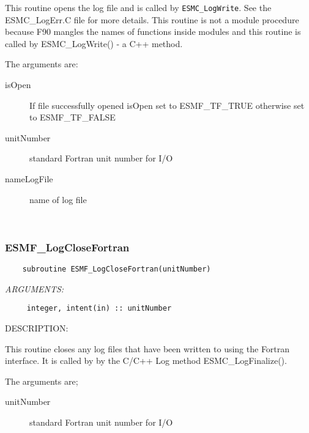    This routine opens the log file and is called by {\tt ESMC\_LogWrite}.
   See the ESMC\_LogErr.C file for more details.
   This routine is not a module procedure because F90 mangles
   the names of functions
   inside modules and this routine is called by ESMC\_LogWrite() - a C++
   method.
  
   The arguments are:
   \begin{description}
  
   \item[isOpen]
   If file successfully opened isOpen set to ESMF\_TF\_TRUE otherwise set
   to ESMF\_TF\_FALSE
  
   \item[unitNumber]
   standard Fortran unit number for I/O
  
   \item[nameLogFile]
   name of log file
  
   \end{description}
   
 
\mbox{}\hrulefill\ 
 
\subsubsection [ESMF\_LogCloseFortran] {ESMF\_LogCloseFortran}


  
\begin{verbatim}    subroutine ESMF_LogCloseFortran(unitNumber)\end{verbatim}{\em ARGUMENTS:}
\begin{verbatim}     integer, intent(in) :: unitNumber\end{verbatim}
{\sf DESCRIPTION:\\ }


   This routine closes any log files that have been written to using
   the Fortran interface.  It is called by by the C/C++ Log
   method ESMC\_LogFinalize().
  
   The arguments are;
   \begin{description}
  
   \item[unitNumber]
   standard Fortran unit number for I/O
  
   \end{description} 
 
